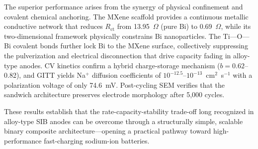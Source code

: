 The superior performance arises from the synergy of physical confinement and covalent chemical anchoring. The MXene scaffold provides a continuous metallic conductive network that reduces $R_{\text{ct}}$ from 13.95~$\Omega$ (pure Bi) to 0.69~$\Omega$, while its two-dimensional framework physically constrains Bi nanoparticles. The Ti---O---Bi covalent bonds further lock Bi to the MXene surface, collectively suppressing the pulverization and electrical disconnection that drive capacity fading in alloy-type anodes. CV kinetics confirm a hybrid charge-storage mechanism ($b = 0.62$--0.82), and GITT yields Na$^{+}$ diffusion coefficients of $10^{-12.5}$--$10^{-13}$~cm$^{2}$~s$^{-1}$ with a polarization voltage of only 74.6~mV. Post-cycling SEM verifies that the sandwich architecture preserves electrode morphology after 5,000 cycles.

These results establish that the rate-capacity-stability trade-off long recognized in alloy-type SIB anodes can be overcome through a structurally simple, scalable binary composite architecture---opening a practical pathway toward high-performance fast-charging sodium-ion batteries.
